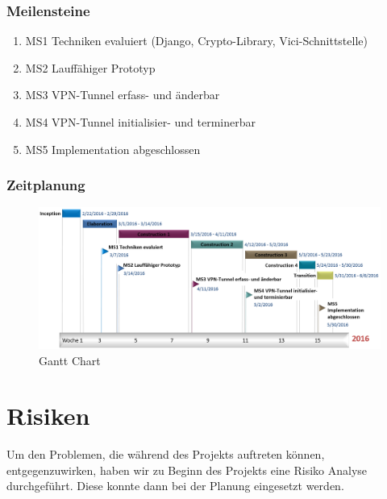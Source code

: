 \begin{landscape}
\subsubsection{Meilensteine}
\begin{enumerate}
	\item MS1 Techniken evaluiert (Django, Crypto-Library, Vici-Schnittstelle)
	\item MS2 Lauffähiger Prototyp
	\item MS3 VPN-Tunnel erfass- und änderbar
	\item MS4 VPN-Tunnel initialisier- und terminerbar
	\item MS5 Implementation abgeschlossen
\end{enumerate}
\subsubsection{Zeitplanung}
	\begin{figure}[H]
		\centering
		\includegraphics[width=240mm]{images/gantt_new.PNG}
		\caption{Gantt Chart}
	\end{figure}
\newpage
\section{Risiken}
Um den Problemen, die während des Projekts auftreten können, entgegenzuwirken, haben wir zu Beginn des Projekts eine Risiko Analyse durchgeführt. Diese konnte dann bei der Planung eingesetzt werden.


\end{landscape}
